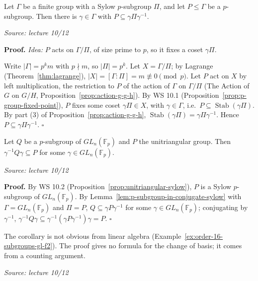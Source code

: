 \documentclass[11pt]{report}
\renewenvironment{proof}[1][Proof]{\noindent\textbf{#1.} }{\hfill$\square$\par\vspace{5pt}}
\newcommand{\srcline}[1]{\par\hfill{\footnotesize\textit{Source: #1}}}
\begin{document}
\begin{lembox}\label{lem:p-subgroup-in-conjugate-sylow}
Let $\Gamma$ be a finite group with a Sylow $p$-subgroup $\Pi$, and let $P \leq \Gamma$ be a $p$-subgroup. Then there is $\gamma \in \Gamma$ with $P \subseteq \gamma \Pi \gamma^{-1}$.
\srcline{lecture 10/12}
\end{lembox}

\begin{proof}
\textit{Idea:} $P$ acts on $\Gamma/\Pi$, of size prime to $p$, so it fixes a coset $\gamma\Pi$.\par
Write $|\Gamma| = p^k m$ with $p \nmid m$, so $|\Pi| = p^k$. Let $X = \Gamma/\Pi$; by Lagrange (Theorem~\ref{thm:lagrange}), $|X| = [\Gamma : \Pi] = m \not\equiv 0 \pmod p$. Let $P$ act on $X$ by left multiplication, the restriction to $P$ of the action of $\Gamma$ on $\Gamma/\Pi$ (The Action of $G$ on $G/H$, Proposition~\ref{prop:action-g-g-h}). By WS 10.1 (Proposition~\ref{prop:p-group-fixed-point}), $P$ fixes some coset $\gamma\Pi \in X$, with $\gamma \in \Gamma$, i.e.\ $P \subseteq \operatorname{Stab}(\gamma\Pi)$. By part (3) of Proposition~\ref{prop:action-g-g-h}, $\operatorname{Stab}(\gamma\Pi) = \gamma\Pi\gamma^{-1}$. Hence $P \subseteq \gamma\Pi\gamma^{-1}$.
\end{proof}

\begin{corbox}\label{cor:p-subgroups-gln-unitriangular}
Let $Q$ be a $p$-subgroup of $GL_n(\mathbb{F}_p)$ and $P$ the unitriangular group. Then $\gamma^{-1} Q \gamma \subseteq P$ for some $\gamma \in GL_n(\mathbb{F}_p)$.
\srcline{lecture 10/12}
\end{corbox}

\begin{proof}
By WS 10.2 (Proposition~\ref{prop:unitriangular-sylow}), $P$ is a Sylow $p$-subgroup of $GL_n(\mathbb{F}_p)$. By Lemma~\ref{lem:p-subgroup-in-conjugate-sylow} with $\Gamma = GL_n(\mathbb{F}_p)$ and $\Pi = P$, $Q \subseteq \gamma P \gamma^{-1}$ for some $\gamma \in GL_n(\mathbb{F}_p)$; conjugating by $\gamma^{-1}$, $\gamma^{-1} Q \gamma \subseteq \gamma^{-1}(\gamma P \gamma^{-1})\gamma = P$.
\end{proof}

\begin{rembox}\label{rem:sylow-surprising}
The corollary is not obvious from linear algebra (Example~\ref{ex:order-16-subgroups-gl-f2}). The proof gives no formula for the change of basis; it comes from a counting argument.
\srcline{lecture 10/12}
\end{rembox}
\end{document}
